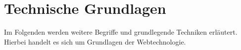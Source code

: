 \section{Technische Grundlagen}
Im Folgenden werden weitere Begriffe und grundlegende Techniken erläutert. Hierbei handelt es sich um Grundlagen der Webtechnologie.










